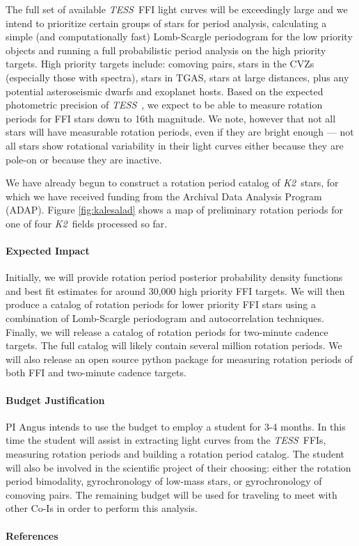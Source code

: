 \documentclass[letterpaper,12pt,preprint]{hack_aastex}
\newcommand{\Ktwo}{{\it K2}}
\newcommand{\ktwo}{\Ktwo}
\newcommand{\TESS}{{\it TESS}}
\newcommand{\tess}{{\it TESS}}
\begin{document}
The full set of available \TESS\ FFI light curves will be exceedingly large
and we intend to prioritize certain groups of stars for period analysis,
calculating a simple (and computationally fast) Lomb-Scargle periodogram for
the low priority objects and running a full probabilistic period analysis on
the high priority targets.
High priority targets include: comoving pairs, stars in the CVZs (especially
those with spectra), stars in TGAS, stars at large distances, plus any
potential asteroseismic dwarfs and exoplanet hosts.
Based on the expected photometric precision of \tess\ \citep{sullivan2015}, we
expect to be able to measure rotation periods for FFI stars down to 16th
magnitude.
We note, however that not all stars will have measurable rotation periods,
even if they are bright enough --- not all stars show rotational variability
in their light curves either because they are pole-on or because they are
inactive.

We have already begun to construct a rotation period catalog of \ktwo\ stars,
for which we have received funding from the Archival Data Analysis Program
(ADAP).
Figure \ref{fig:kalesalad} shows a map of preliminary rotation periods for one
of four \ktwo\ fields processed so far.


\paragraph{Expected Impact}
Initially, we will provide rotation period posterior probability density
functions and best fit estimates for around 30,000 high priority FFI targets.
We will then produce a catalog of rotation periods for lower priority FFI
stars using a combination of Lomb-Scargle periodogram and autocorrelation
techniques.
Finally, we will release a catalog of rotation periods for two-minute cadence
targets.
The full catalog will likely contain several million rotation periods.
We will also release an open source python package for measuring rotation
periods of both FFI and two-minute cadence targets.

\paragraph{Budget Justification}
PI Angus intends to use the budget to employ a student for 3-4 months.
In this time the student will assist in extracting light curves from the
\tess\ FFIs, measuring rotation periods and building a rotation period
catalog.
The student will also be involved in the scientific project of their choosing:
either the rotation period bimodality, gyrochronology of low-mass stars, or
gyrochronology of comoving pairs.
The remaining budget will be used for traveling to meet with other Co-Is in
order to perform this analysis.
\paragraph{References}

{\footnotesize

}
\end{document}
